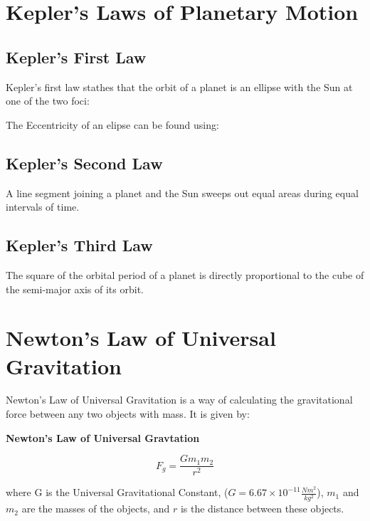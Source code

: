 	
	
	\section{Kepler's Laws of Planetary Motion}  
	\subsection{Kepler's First Law}
	    Kepler's first law stathes that the orbit of a planet is an ellipse with the Sun at one of the two foci:
	    


		The Eccentricity of an elipse can be found using: 
		
	
	\subsection{Kepler's Second Law}
		A line segment joining a planet and the Sun sweeps out equal areas during equal intervals of time.
		
		
		
	\subsection{Kepler's Third Law}
			The square of the orbital period of a planet is directly proportional to the cube of the semi-major axis of its orbit.
	
	
	
	
	\section{Newton's Law of Universal Gravitation} 
	
	Newton's Law of Universal Gravitation is a way of calculating the gravitational force between any two objects with mass.  It is given by: 
	\begin{mdframed}[backgroundcolor=orange!20!white]
		\begin{center}
\textbf{Newton's Law of Universal Gravtation}
		\end{center}
		\begin{equation}
		F_g = \frac{G m_1m_2}{r^2}
		\label{equation:UniversalGravitation}
		\end{equation}
	\end{mdframed}
	where G is the Universal Gravitational Constant, ($G = 6.67 \times 10^{-11} \frac{Nm^2}{kg^2}$), $m_1$ and $m_2$ are the masses of the objects, and $r$ is the distance between these objects.   
	
